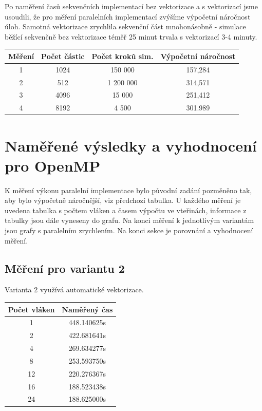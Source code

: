 \documentclass[12pt]{article}
\begin{document}
Po naměření časů sekvenčních implementací bez vektorizace a s vektorizací jsme usoudili, že pro měření paralelních implementací zvýšíme výpočetní náročnost úloh.
Samotná vektorizace zrychlila sekvenční část mnohonásobně - simulace běžící sekvenčně bez vektorizace téměř 25 minut trvala s vektorizací 3-4 minuty.

\begin{center}
\begin{tabular}{c | c | c | c}
\textbf{Měření} & \textbf{Počet částic} & \textbf{Počet kroků sim.} & \textbf{Výpočetní náročnost} \\ \hline \hline
1 & 1024 & 150 000 & 157,284 \\ \hline
2 & 512 & 1 200 000 & 314,571 \\ \hline
3 & 4096 & 15 000 & 251,412 \\ \hline
4 & 8192 & 4 500 & 301.989 \\ \hline
\end{tabular}
\end{center}

\section{Naměřené výsledky a vyhod\-noce\-ní pro O\-pen\-MP}
K měření výkonu paralelní implementace bylo původní zadání pozměněno tak, aby bylo výpočetně náročnější, viz předchozí tabulka.
U každého měření je uvedena tabulka s počtem vláken a časem výpočtu ve vteřinách, informace z tabulky jsou dále vyneseny do grafu.
Na konci měření k jednotlivým variantám jsou grafy s paralelním zrychlením.
Na konci sekce je porovnání a vyhodnocení měření.

\subsection{Měření pro variantu 2}
Varianta 2 využívá automatické vektorizace. %
%
%
\begin{center}
\begin{tabular}{ c | c }
\textbf{Počet vláken} & \textbf{Naměřený čas} \\ \hline \hline 
1 & 448.140625s \\ \hline
2 & 422.681641s \\ \hline
4 & 269.634277s \\ \hline
8 & 253.593750s \\ \hline
12 & 220.276367s \\ \hline
16 & 188.523438s \\ \hline
24 & 188.625000s \\ \hline
\end{tabular}
\end{center}
\end{document}
